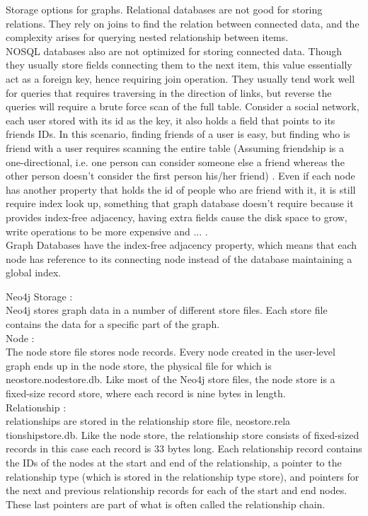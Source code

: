 \documentclass[english]{tktltiki}
\begin{document}
Storage options for graphs.
Relational databases are not good for storing relations. They rely on joins to find the relation between connected data, and the complexity arises for 
querying nested relationship between items. \\
NOSQL databases also are not optimized for storing connected data. Though they usually store fields connecting them to the next item, this value essentially act as a foreign key, hence requiring join operation. They usually tend work well for queries that requires traversing in the direction of links, but reverse the queries will require a brute force scan of the full table. Consider a social network, each user stored with its id as the key, it also holds a field that points to its friends IDs. In this scenario, finding friends of a user is easy, but finding who is friend with a user requires scanning the entire table (Assuming friendship is a one-directional, i.e. one person can consider someone else a friend whereas the other person doesn't consider the first person his/her friend) . Even if each node has another property that holds the id of people who are friend with it, it is still require index look up, something that graph database doesn't require because it provides index-free adjacency, having extra fields cause the disk space to grow, write operations to be more expensive and ... .\\
Graph Databases have the index-free adjacency property, which means that each node has reference to its connecting node instead of the database maintaining a global index.

Neo4j Storage :\\
Neo4j stores graph data in a number of different store files. Each store file contains the data for a specific part of the graph.\\
Node :\\
The node store file stores node records. Every node created in the user-level graph ends up in the node store, the physical file for which is neostore.nodestore.db. Like most of the Neo4j store files, the node store is a fixed-size record store, where each record is nine bytes in length. \\
Relationship :\\
relationships are stored in the relationship store file, neostore.rela tionshipstore.db. Like the node store, the relationship store consists of fixed-sized records in this case each record is 33 bytes long. Each relationship record contains the IDs of the nodes at the start and end of the relationship, a pointer to the relationship type (which is stored in the relationship type store), and pointers for the next and previous relationship records for each of the start and end nodes. These last pointers are part of what is often called the relationship chain.
\end{document}
